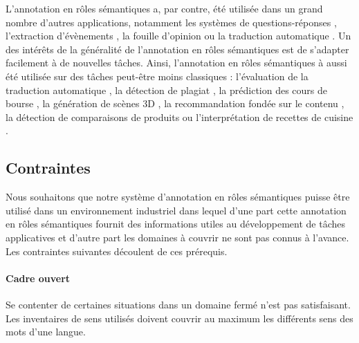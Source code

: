 L'annotation en rôles sémantiques a, par contre, été utilisée dans un grand
nombre d'autres applications, notamment les systèmes de questions-réponses
\citep{shen2007using}, l'extraction d'évènements \citep{exner2011using}, la
fouille d'opinion \citep{das2012structure} ou la traduction automatique
\citep{bazrafshan2013semantic,bazrafshan2014comparing}. Un des intérêts de la
généralité de l'annotation en rôles sémantiques est de s'adapter facilement à
de nouvelles tâches. Ainsi, l'annotation en rôles sémantiques à aussi été
utilisée sur des tâches peut-être moins classiques : l'évaluation de la
traduction automatique \citep{lo2011meant,chuchunkov2014applying}, la détection
de plagiat \citep{osman2012improved}, la prédiction des cours de bourse
\citep{xie2013semantic}, la génération de scènes 3D \citep{chang2014learning},
la recommandation fondée sur le contenu \citep{de2014exploiting}, la détection
de comparaisons de produits \citep{kessler2013detection} ou l'interprétation de
recettes de cuisine \citep{malmaud2014cooking}.

\subsection{Contraintes}

Nous souhaitons que notre système d'annotation en rôles sémantiques puisse être
utilisé dans un environnement industriel dans lequel d'une part cette
annotation en rôles sémantiques fournit des informations utiles au
développement de tâches applicatives et d'autre part les domaines à couvrir ne
sont pas connus à l'avance. Les contraintes suivantes découlent de ces
prérequis.

\paragraph{Cadre ouvert} Se contenter de certaines situations dans un domaine
fermé n'est pas satisfaisant. Les inventaires de sens utilisés doivent couvrir
au maximum les différents sens des mots d'une langue.

